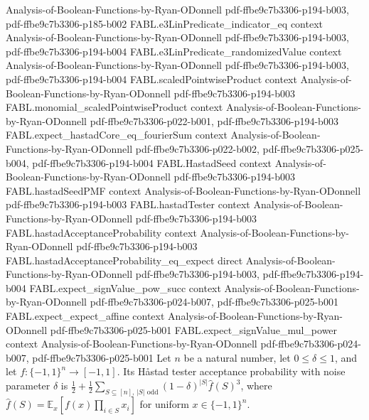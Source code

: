 \begin{theorem}
  {Analysis-of-Boolean-Functions-by-Ryan-ODonnell}
  {pdf-ffbe9c7b3306-p194-b003,
    pdf-ffbe9c7b3306-p185-b002}
\proofstep
  {FABL.e3LinPredicate_indicator_eq}
  {context}
  {Analysis-of-Boolean-Functions-by-Ryan-ODonnell}
  {pdf-ffbe9c7b3306-p194-b003,
    pdf-ffbe9c7b3306-p194-b004}
\proofstep
  {FABL.e3LinPredicate_randomizedValue}
  {context}
  {Analysis-of-Boolean-Functions-by-Ryan-ODonnell}
  {pdf-ffbe9c7b3306-p194-b003,
    pdf-ffbe9c7b3306-p194-b004}
\proofstep
  {FABL.scaledPointwiseProduct}
  {context}
  {Analysis-of-Boolean-Functions-by-Ryan-ODonnell}
  {pdf-ffbe9c7b3306-p194-b003}
\proofstep
  {FABL.monomial_scaledPointwiseProduct}
  {context}
  {Analysis-of-Boolean-Functions-by-Ryan-ODonnell}
  {pdf-ffbe9c7b3306-p022-b001,
    pdf-ffbe9c7b3306-p194-b003}
\proofstep
  {FABL.expect_hastadCore_eq_fourierSum}
  {context}
  {Analysis-of-Boolean-Functions-by-Ryan-ODonnell}
  {pdf-ffbe9c7b3306-p022-b002,
    pdf-ffbe9c7b3306-p025-b004,
    pdf-ffbe9c7b3306-p194-b004}
\proofstep
  {FABL.HastadSeed}
  {context}
  {Analysis-of-Boolean-Functions-by-Ryan-ODonnell}
  {pdf-ffbe9c7b3306-p194-b003}
\proofstep
  {FABL.hastadSeedPMF}
  {context}
  {Analysis-of-Boolean-Functions-by-Ryan-ODonnell}
  {pdf-ffbe9c7b3306-p194-b003}
\proofstep
  {FABL.hastadTester}
  {context}
  {Analysis-of-Boolean-Functions-by-Ryan-ODonnell}
  {pdf-ffbe9c7b3306-p194-b003}
\proofstep
  {FABL.hastadAcceptanceProbability}
  {context}
  {Analysis-of-Boolean-Functions-by-Ryan-ODonnell}
  {pdf-ffbe9c7b3306-p194-b003}
\proofstep
  {FABL.hastadAcceptanceProbability_eq_expect}
  {direct}
  {Analysis-of-Boolean-Functions-by-Ryan-ODonnell}
  {pdf-ffbe9c7b3306-p194-b003,
    pdf-ffbe9c7b3306-p194-b004}
\proofstep
  {FABL.expect_signValue_pow_succ}
  {context}
  {Analysis-of-Boolean-Functions-by-Ryan-ODonnell}
  {pdf-ffbe9c7b3306-p024-b007,
    pdf-ffbe9c7b3306-p025-b001}
\proofstep
  {FABL.expect_expect_affine}
  {context}
  {Analysis-of-Boolean-Functions-by-Ryan-ODonnell}
  {pdf-ffbe9c7b3306-p025-b001}
\proofstep
  {FABL.expect_signValue_mul_power}
  {context}
  {Analysis-of-Boolean-Functions-by-Ryan-ODonnell}
  {pdf-ffbe9c7b3306-p024-b007,
    pdf-ffbe9c7b3306-p025-b001}
Let $n$ be a natural number, let $0\leq\delta\leq1$, and let $f:\{-1,1\}^n\to[-1,1]$.
Its Håstad tester acceptance probability with noise parameter $\delta$ is
$\frac12+\frac12\sum_{S\subseteq[n],\,|S|\text{ odd}}(1-\delta)^{|S|}\widehat f(S)^3$,
where $\widehat f(S)=\mathbb E_x[f(x)\prod_{i\in S}x_i]$ for uniform $x\in\{-1,1\}^n$.
\end{theorem}

